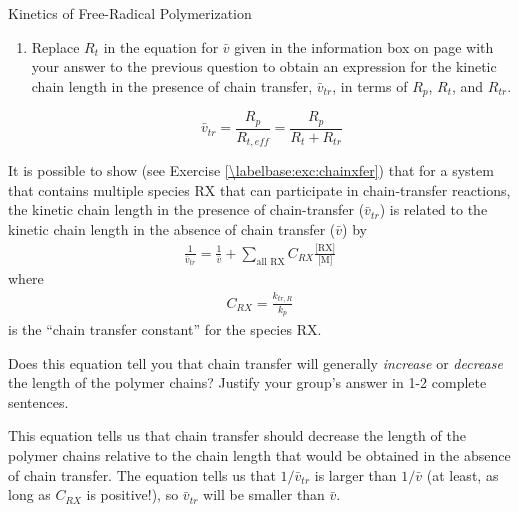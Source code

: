 \begin{activity}{Kinetics of Free-Radical Polymerization}
\begin{ctqs}
\begin{enumerate}
\begin{solution}[0.5in]{}
		\end{solution}
			
			\item Replace $R_t$ in the equation for $\bar v$ given in the information box on page \pageref{\labelbase:infobox:kineticchainlength} with your answer to the previous question to obtain an expression for the kinetic chain length in the presence of chain transfer, $\bar v_{tr}$, in terms of $R_p$, $R_t$, and $R_{tr}$.
		
		\begin{solution}[0.5in]{}
	
			\begin{equation*}
				\bar v_{tr} = \frac{R_p}{R_{t,eff}}  = \frac{R_p}{R_t + R_{tr}}
			\end{equation*}
	
		\end{solution}
		
		\end{enumerate}
		
\end{ctqs}

\begin{infobox}
\label{\labelbase:info:vtr}

	It is possible to show (see Exercise \ref{\labelbase:exc:chainxfer}) that for a system that contains multiple species RX that can participate in chain-transfer reactions, the kinetic chain length in the presence of chain-transfer ($\bar v_{tr}$) is related to the kinetic chain length in the absence of chain transfer ($\bar v$) by
	\begin{align*}
		\frac{1}{\bar v_{tr}} = \frac{1}{\bar v} + \sum_{\text{all RX}} C_{RX}\frac{\text{[RX]}}{\text{[M]}}
	\end{align*}
	where
	\begin{align*}
		C_{RX} = \frac{k_{tr,R}}{k_p}
	\end{align*}
	is the ``chain transfer constant'' for the species RX.
	
\end{infobox}

\begin{ctqs}

	\question Does this equation tell you that chain transfer will generally \emph{increase} or \emph{decrease} the length of the polymer chains?  Justify your group's answer in 1-2 complete sentences.
	
		\begin{solution}[2in]{}
			This equation tells us that chain transfer should decrease the length of the polymer chains relative to the chain length that would be obtained in the absence of chain transfer.  The equation tells us that $1/\bar v_{tr}$ is larger than $1/\bar v$ (at least, as long as $C_{RX}$ is positive!), so $\bar v_{tr}$ will be smaller than $\bar v$.
		\end{solution}
		

\end{ctqs}
\end{activity}
